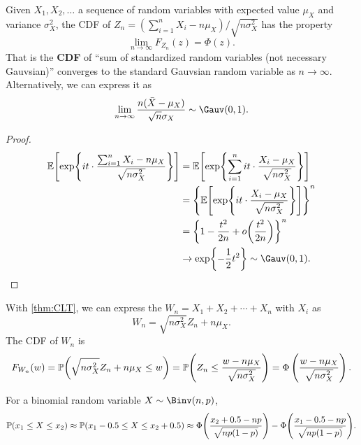 \begin{theorem}
    \label{thm:CLT}
    Given $X_1, X_2,\ldots$ a sequence of \iid random variables with expected value $\mu_X$ and variance $\sigma_X^2$, the \textnormal{CDF} of $Z_n=(\sum_{i=1}^{n}X_i-n\mu_X)/\sqrt{n\sigma_X^2}$ has the property
    \[\lim_{n\rightarrow \infty}F_{Z_n}(z)=\Phi(z).\]
    That is the \textbf{CDF} of ``sum of standardized \iid random variables (not necessary Gauvsian)'' converges to the standard Gauvsian random variable as $n\rightarrow\infty$. Alternatively, we can express it as
    \[\lim_{n\rightarrow \infty}\frac{n(\bar{X}-\mu_X)}{\sqrt{n}\sigma_X}\sim \Gauv(0, 1).\]
\end{theorem}

\begin{proof}
    \begin{align*}
        \E{\exp\braces*{it\cdot \frac{\sum_{i=1}^{n}X_i-n\mu_X}{\sqrt{n\sigma_X^2}}}}
        &= \E{\exp\braces*{\sum_{i=1}^{n} it\cdot \frac{X_i-\mu_X}{\sqrt{n\sigma_X^2}}}} \\
        &= \braces*{\E{\exp\braces*{it\cdot \frac{X_i-\mu_X}{\sqrt{n\sigma_X^2}}}}}^n \\
        &= \braces*{1-\frac{t^2}{2n}+o\parens*{\frac{t^2}{2n}}}^n \\
        &\rightarrow \exp\braces*{-\frac{1}{2}t^2} \sim \Gauv(0,1).
    \end{align*}
\end{proof}

\begin{corollary}
    With \cref{thm:CLT}, we can express the $W_n=X_1+X_2+\cdots+X_n$ with \iid $X_i$ as
    \[W_n=\sqrt{n\sigma_X^2}Z_n+n\mu_X.\]
    The \textnormal{CDF} of $W_n$ is
    \[F_{W_n}(w)=\P{\sqrt{n\sigma_X^2}Z_n+n\mu_X\leq w}=\P{Z_n\leq \frac{w-n\mu_X}{\sqrt{n\sigma_X^2}}}=\Phi\left(\frac{w-n\mu_X}{\sqrt{n\sigma_X^2}}\right).\]
\end{corollary}

\begin{theorem}
    \label{thm:DeMoivreLaplace}
    For a binomial random variable $X\sim \Binv(n,p)$,
    \[\P{x_1\leq X\leq x_2}\approx \P{x_1-0.5\leq X\leq x_2+0.5}\approx \Phi\parens*{\frac{x_2+0.5-np}{\sqrt{np(1-p)}}}-\Phi\parens*{\frac{x_1-0.5-np}{\sqrt{np(1-p)}}}.\]
\end{theorem}


